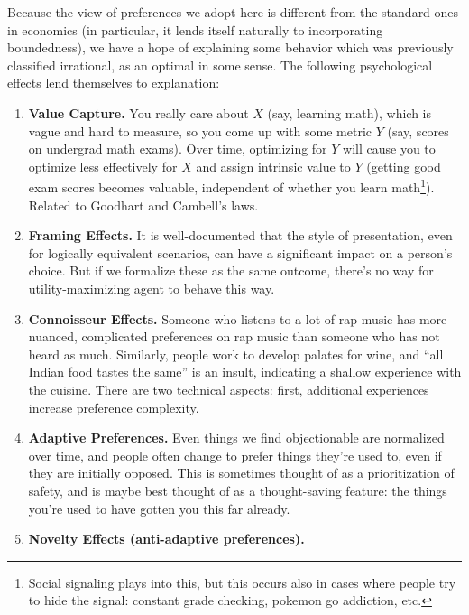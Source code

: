 \documentclass{article}
\begin{document}
	Because the view of preferences we adopt here is different from the standard ones in economics (in particular, it lends itself naturally to incorporating boundedness), we have a hope of explaining some behavior which was previously classified irrational, as an optimal in some sense. The following psychological effects lend themselves to explanation:
	\begin{enumerate}[noitemsep]
		\item \textbf{Value Capture.} You really care about $X$ (say, learning math), which is vague and hard to measure, so you come up with some metric $Y$ (say, scores on undergrad math exams). Over time, optimizing for $Y$ will cause you to optimize less effectively for $X$ and assign intrinsic value to $Y$ (getting good exam scores becomes valuable, independent of whether you learn math\footnote{Social signaling plays into this, but this occurs also in cases where people try to hide the signal: constant grade checking, pokemon go addiction, etc.}). Related to Goodhart and Cambell's laws.
		\item \textbf{Framing Effects.} It is well-documented that the style of presentation, even for logically equivalent scenarios, can have a significant impact on a person's choice. But if we formalize these as the same outcome, there's no way for utility-maximizing agent to behave this way.
		\item \textbf{Connoisseur Effects.} Someone who listens to a lot of rap music has more nuanced, complicated preferences on rap music than someone who has not heard as much. Similarly, people work to develop palates for wine, and ``all Indian food tastes the same'' is an insult, indicating a shallow experience with the cuisine. There are two technical aspects: first, additional experiences increase preference complexity.
		
		\item \textbf{Adaptive Preferences.} Even things we find objectionable are normalized over time, and people often change to prefer things they're used to, even if they are initially opposed. This is sometimes thought of as a prioritization of safety, and is maybe best thought of as a thought-saving feature: the things you're used to have gotten you this far already. 
		
		
		\item \textbf{Novelty Effects (anti-adaptive preferences).} 
		
	\end{enumerate}
\end{document}
